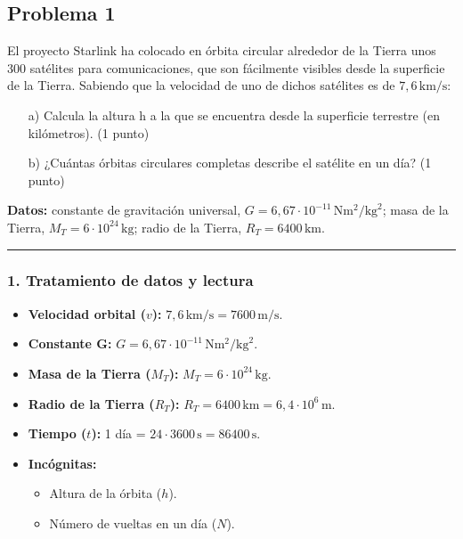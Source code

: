 \newpage

\subsection{Problema 1}
\label{subsec:P1_2020_sep_ext}

\begin{cajaenunciado}
El proyecto Starlink ha colocado en órbita circular alrededor de la Tierra unos 300 satélites para comunicaciones, que son fácilmente visibles desde la superficie de la Tierra. Sabiendo que la velocidad de uno de dichos satélites es de $7,6\,\text{km/s}$:
\begin{enumerate}
    \item[a)] Calcula la altura h a la que se encuentra desde la superficie terrestre (en kilómetros). (1 punto)
    \item[b)] ¿Cuántas órbitas circulares completas describe el satélite en un día? (1 punto)
\end{enumerate}
\textbf{Datos:} constante de gravitación universal, $G=6,67\cdot10^{-11}\,\text{N}\text{m}^2/\text{kg}^2$; masa de la Tierra, $M_T=6\cdot10^{24}\,\text{kg}$; radio de la Tierra, $R_T=6400\,\text{km}$.
\end{cajaenunciado}
\hrule

\subsubsection*{1. Tratamiento de datos y lectura}
\begin{itemize}
    \item \textbf{Velocidad orbital ($v$):} $7,6\,\text{km/s} = 7600\,\text{m/s}$.
    \item \textbf{Constante G:} $G = 6,67\cdot10^{-11}\,\text{N}\text{m}^2/\text{kg}^2$.
    \item \textbf{Masa de la Tierra ($M_T$):} $M_T = 6\cdot10^{24}\,\text{kg}$.
    \item \textbf{Radio de la Tierra ($R_T$):} $R_T = 6400\,\text{km} = 6,4\cdot10^6\,\text{m}$.
    \item \textbf{Tiempo ($t$):} 1 día = $24 \cdot 3600\,\text{s} = 86400\,\text{s}$.
    \item \textbf{Incógnitas:}
    \begin{itemize}
        \item Altura de la órbita ($h$).
        \item Número de vueltas en un día ($N$).
    \end{itemize}
\end{itemize}


